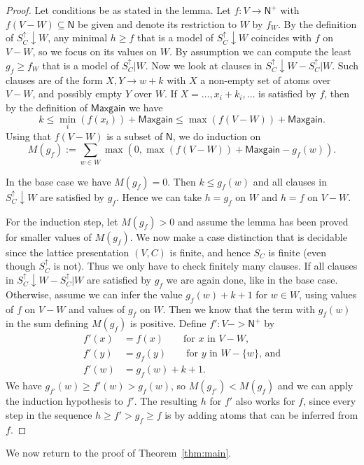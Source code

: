 \documentclass[11pt,a4paper]{article}
\newcommand{\N}{\mathsf{N}}
\newcommand\set[1]{\{#1\}}
\newcommand\Ninf{\N^+}
\newcommand\M{\mathsf{Maxgain}}
\begin{document}
\begin{proof}
Let conditions be as stated in the lemma.
Let $f: V\to\Ninf$ with $f(V-W)\subseteq \N$ be given
and denote its restriction to $W$ by $f_W$.
By the definition of $S^\uparrow_C{\downarrow}W$, any minimal $h\geq f$
that is a model of $S^\uparrow_C{\downarrow}W$
coincides with $f$ on $V-W$, so we focus on its values on $W$.
By assumption we can compute the least $g_f \geq f_W$ that 
is a model of $S^\uparrow_C|W$.
Now we look at clauses in $S^\uparrow_C{\downarrow}W - S^\uparrow_C|W$. 
Such clauses are of the form $X,Y \to w+k$ with $X$ a non-empty
set of atoms over $V-W$, and possibly empty $Y$ over $W$. 
If $X = \ldots,x_i+k_i,\ldots$ is satisfied by $f$, 
then by the definition of $\M$ we have
\[
k \leq\min_i(f(x_i)) + \M \leq \max(f(V-W)) + \M.
\]								
Using that $f(V-W)$ is a subset of $\N$, we do induction on 
\[
M(g_f) := \sum_{w \in W}  \max(0, \max(f(V-W)) + \M - g_f(w)).
\] 

In the base case we have $M(g_f)=0$.
Then $k\leq g_f(w)$ and all clauses in $S^\uparrow_C{\downarrow}W$ are 
satisfied by $g_f$.
Hence we can take $h=g_f$ on $W$ and $h=f$ on $V-W$.

For the induction step, let $M(g_f)>0$ and assume
the lemma has been proved for smaller values of $M(g_f)$.
We now make a case distinction that is decidable since
the lattice presentation $(V,C)$ is finite,
and hence $S_C$ is finite (even though $S^\uparrow_C$ is not).
Thus we only have to check finitely many clauses.
If all clauses in $S^\uparrow_C{\downarrow}W - S^\uparrow_C|W$ are satisfied 
by $g_f$ we are again done, like in the base case.
Otherwise, assume we can infer the value $g_f(w)+k+1$
for $w\in W$, using values of $f$ on $V-W$ and values 
of $g_f$ on $W$. Then we know that the term with $g_f(w)$
in the sum defining $M(g_f)$ is positive.
Define $f' : V -> \Ninf$ by 
\begin{align*}
f'(x)&= f(x)   \quad\quad\text{for $x$ in $V-W$,}\\ 
f'(y)&= g_f(y) \quad\quad\text{for $y$ in $W-\set{w}$, and}\\ 
f'(w)&= g_f(w)+k+1. 
\end{align*}
We have $g_{f'}(w) \geq f'(w) > g_f(w)$, so $M(g_{f'}) < M(g_f)$
and we can apply the induction hypothesis to $f'$.
The resulting $h$ for $f'$ also works for $f$,
since every step in the sequence 
$h \geq f' > g_f \geq f$
is by adding atoms that can be inferred from $f$.
\end{proof}

We now return to the proof of Theorem~\ref{thm:main}.
\end{document}
